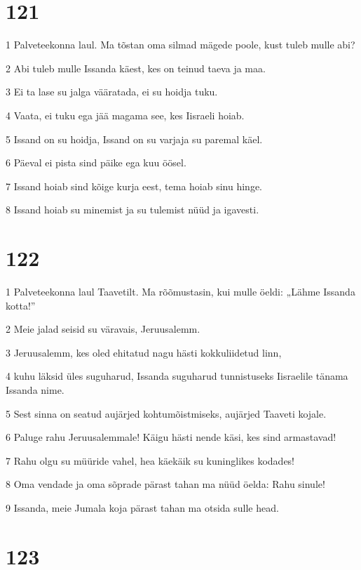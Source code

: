 \chapter{121}

\par 1 Palveteekonna laul. Ma tõstan oma silmad mägede poole, kust tuleb mulle abi?
\par 2 Abi tuleb mulle Issanda käest, kes on teinud taeva ja maa.
\par 3 Ei ta lase su jalga vääratada, ei su hoidja tuku.
\par 4 Vaata, ei tuku ega jää magama see, kes Iisraeli hoiab.
\par 5 Issand on su hoidja, Issand on su varjaja su paremal käel.
\par 6 Päeval ei pista sind päike ega kuu öösel.
\par 7 Issand hoiab sind kõige kurja eest, tema hoiab sinu hinge.
\par 8 Issand hoiab su minemist ja su tulemist nüüd ja igavesti.

\chapter{122}

\par 1 Palveteekonna laul Taavetilt. Ma rõõmustasin, kui mulle öeldi: „Lähme Issanda kotta!”
\par 2 Meie jalad seisid su väravais, Jeruusalemm.
\par 3 Jeruusalemm, kes oled ehitatud nagu hästi kokkuliidetud linn,
\par 4 kuhu läksid üles suguharud, Issanda suguharud tunnistuseks Iisraelile tänama Issanda nime.
\par 5 Sest sinna on seatud aujärjed kohtumõistmiseks, aujärjed Taaveti kojale.
\par 6 Paluge rahu Jeruusalemmale! Käigu hästi nende käsi, kes sind armastavad!
\par 7 Rahu olgu su müüride vahel, hea käekäik su kuninglikes kodades!
\par 8 Oma vendade ja oma sõprade pärast tahan ma nüüd öelda: Rahu sinule!
\par 9 Issanda, meie Jumala koja pärast tahan ma otsida sulle head.

\chapter{123}

